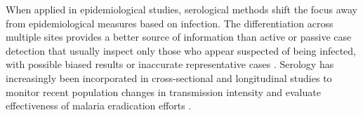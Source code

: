 When applied in epidemiological studies, serological methods shift the focus away from epidemiological measures based on infection.
The differentiation across multiple sites provides a better source of information than active or passive case detection that usually inspect only those who appear suspected of being infected, with possible biased results or inaccurate representative cases \cite{nkumama2017changes}.
Serology has increasingly been incorporated in cross-sectional and longitudinal studies to monitor recent population changes in transmission intensity \cite{cook2010using, cook2011serological, hay2008measuring} and evaluate effectiveness of malaria eradication efforts \cite{bruce1973seroepidemiological}.

